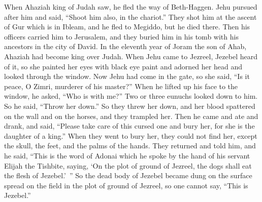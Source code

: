\begin{biblechapter}
 When Ahaziah king of Judah saw, he fled the way of Beth-Haggen. Jehu pursued after him and said, “Shoot him also, in the chariot.” They shot him at the ascent of Gur which is in Ibleam, and he fled to Megiddo, but he died there.
\verse Then his officers carried him to Jerusalem, and they buried him in his tomb with his ancestors in the city of David.
\verse In the eleventh year of Joram the son of Ahab, Ahaziah had become king over Judah.
 When Jehu came to Jezreel, Jezebel heard of it, so she painted her eyes with black eye paint and adorned her head and looked through the window.
\verse Now Jehu had come in the gate, so she said, “Is it peace, O Zimri, murderer of his master?”
\verse When he lifted up his face to the window, he asked, “Who is with me?” Two or three eunuchs looked down to him.
\verse So he said, “Throw her down.” So they threw her down, and her blood spattered on the wall and on the horses, and they trampled her.
\verse Then he came and ate and drank, and said, “Please take care of this cursed one and bury her, for she is the daughter of a king.”
\verse When they went to bury her, they could not find her, except the skull, the feet, and the palms of the hands.
\verse They returned and told him, and he said, “This is the word of Adonai which he spoke by the hand of his servant Elijah the Tishbite, saying, ‘On the plot of ground of Jezreel, the dogs shall eat the flesh of Jezebel.’ ”
\verse So the dead body of Jezebel became dung on the surface spread on the field in the plot of ground of Jezreel, so one cannot say, “This is Jezebel.”
\end{biblechapter}

